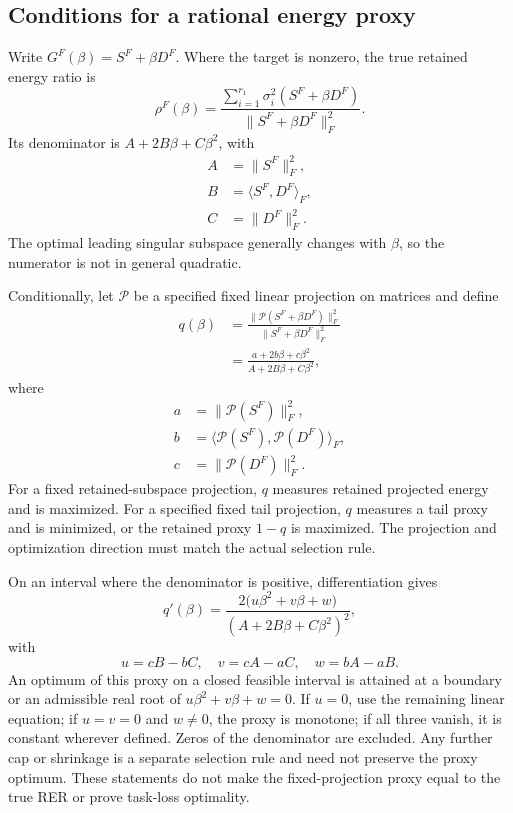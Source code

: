 \subsection{Conditions for a rational energy proxy}\label{sup:beta-proxy}

Write $G^F(\beta)=S^F+\beta D^F$. Where the target is nonzero, the true retained energy ratio is
\begin{equation}
\rho^F(\beta)=\frac{\sum_{i=1}^{r_1}\sigma_i^2(S^F+\beta D^F)}{\|S^F+\beta D^F\|_F^2}.
\end{equation}
Its denominator is $A+2B\beta+C\beta^2$, with
\begin{equation}
\begin{aligned}
A&=\|S^F\|_F^2,\\
B&=\langle S^F,D^F\rangle_F,\\
C&=\|D^F\|_F^2.
\end{aligned}
\end{equation}
The optimal leading singular subspace generally changes with $\beta$, so the numerator is not in general quadratic.

Conditionally, let $\mathcal P$ be a specified fixed linear projection on matrices and define
\begin{equation}
\begin{aligned}
q(\beta)&=\frac{\|\mathcal P(S^F+\beta D^F)\|_F^2}{\|S^F+\beta D^F\|_F^2}\\
&=\frac{a+2b\beta+c\beta^2}{A+2B\beta+C\beta^2},
\end{aligned}
\end{equation}
where
\begin{equation}
\begin{aligned}
a&=\|\mathcal P(S^F)\|_F^2, \\
b&=\langle\mathcal P(S^F),\mathcal P(D^F)\rangle_F, \\
c&=\|\mathcal P(D^F)\|_F^2.
\end{aligned}
\end{equation}
For a fixed retained-subspace projection, $q$ measures retained projected energy and is maximized. For a specified fixed tail projection, $q$ measures a tail proxy and is minimized, or the retained proxy $1-q$ is maximized. The projection and optimization direction must match the actual selection rule.

On an interval where the denominator is positive, differentiation gives
\begin{equation}
q'(\beta)=\frac{2\big(u\beta^2+v\beta+w\big)}{(A+2B\beta+C\beta^2)^2},
\end{equation}
with
\begin{equation}
u=cB-bC,\quad v=cA-aC,\quad w=bA-aB.
\end{equation}
An optimum of this proxy on a closed feasible interval is attained at a boundary or an admissible real root of $u\beta^2+v\beta+w=0$. If $u=0$, use the remaining linear equation; if $u=v=0$ and $w\ne0$, the proxy is monotone; if all three vanish, it is constant wherever defined. Zeros of the denominator are excluded. Any further cap or shrinkage is a separate selection rule and need not preserve the proxy optimum. These statements do not make the fixed-projection proxy equal to the true RER or prove task-loss optimality.


